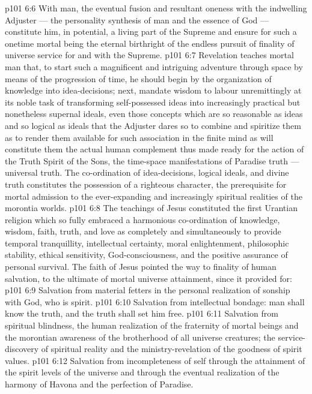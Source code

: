 \vs p101 6:6 With man, the eventual fusion and resultant oneness with the indwelling Adjuster --- the personality synthesis of man and the essence of God --- constitute him, in potential, a living part of the Supreme and ensure for such a onetime mortal being the eternal birthright of the endless pursuit of finality of universe service for and with the Supreme.
\vs p101 6:7 \pc Revelation teaches mortal man that, to start such a magnificent and intriguing adventure through space by means of the progression of time, he should begin by the organization of knowledge into idea\hyp{}decisions; next, mandate wisdom to labour unremittingly at its noble task of transforming self\hyp{}possessed ideas into increasingly practical but nonetheless supernal ideals, even those concepts which are so reasonable as ideas and so logical as ideals that the Adjuster dares so to combine and spiritize them as to render them available for such association in the finite mind as will constitute them the actual human complement thus made ready for the action of the Truth Spirit of the Sons, the time\hyp{}space manifestations of Paradise truth --- universal truth. The co\hyp{}ordination of idea\hyp{}decisions, logical ideals, and divine truth constitutes the possession of a righteous character, the prerequisite for mortal admission to the ever\hyp{}expanding and increasingly spiritual realities of the morontia worlds.
\vs p101 6:8 The teachings of Jesus constituted the first Urantian religion which so fully embraced a harmonious co\hyp{}ordination of knowledge, wisdom, faith, truth, and love as completely and simultaneously to provide temporal tranquillity, intellectual certainty, moral enlightenment, philosophic stability, ethical sensitivity, God\hyp{}consciousness, and the positive assurance of personal survival. The faith of Jesus pointed the way to finality of human salvation, to the ultimate of mortal universe attainment, since it provided for:
\vs p101 6:9 \bibnobreakspace Salvation from material fetters in the personal realization of sonship with God, who is spirit.
\vs p101 6:10 \bibnobreakspace Salvation from intellectual bondage: man shall know the truth, and the truth shall set him free.
\vs p101 6:11 \bibnobreakspace Salvation from spiritual blindness, the human realization of the fraternity of mortal beings and the morontian awareness of the brotherhood of all universe creatures; the service\hyp{}discovery of spiritual reality and the ministry\hyp{}revelation of the goodness of spirit values.
\vs p101 6:12 \bibnobreakspace Salvation from incompleteness of self through the attainment of the spirit levels of the universe and through the eventual realization of the harmony of Havona and the perfection of Paradise.
